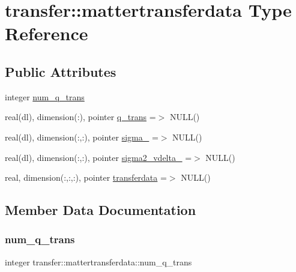\hypertarget{structtransfer_1_1mattertransferdata}{}\section{transfer\+:\+:mattertransferdata Type Reference}
\label{structtransfer_1_1mattertransferdata}
\subsection*{Public Attributes}
\begin{DoxyCompactItemize}
\item 
integer \mbox{\hyperlink{structtransfer_1_1mattertransferdata_a3a7ece899f19ed6b2ec33ee703f794ba}{num\+\_\+q\+\_\+trans}}
\item 
real(dl), dimension(\+:), pointer \mbox{\hyperlink{structtransfer_1_1mattertransferdata_a2f577e26c8384bb705f15c615f7a4b98}{q\+\_\+trans}} =$>$ N\+U\+LL()
\item 
real(dl), dimension(\+:,\+:), pointer \mbox{\hyperlink{structtransfer_1_1mattertransferdata_ad9b37b26038c1a9e8fffd5b6db6a6b81}{sigma\+\_}} =$>$ N\+U\+LL()
\item 
real(dl), dimension(\+:,\+:), pointer \mbox{\hyperlink{structtransfer_1_1mattertransferdata_a6b80c63e2083d374361bdb7257c03a01}{sigma2\+\_\+vdelta\+\_}} =$>$ N\+U\+LL()
\item 
real, dimension(\+:,\+:,\+:), pointer \mbox{\hyperlink{structtransfer_1_1mattertransferdata_a99048c57a9052b4b9859f6b0af2b32b6}{transferdata}} =$>$ N\+U\+LL()
\end{DoxyCompactItemize}


\subsection{Member Data Documentation}
\mbox{\label{structtransfer_1_1mattertransferdata_a3a7ece899f19ed6b2ec33ee703f794ba}} 
\subsubsection{\texorpdfstring{num\+\_\+q\+\_\+trans}{num\_q\_trans}}
{\footnotesize\ttfamily integer transfer\+::mattertransferdata\+::num\+\_\+q\+\_\+trans}

